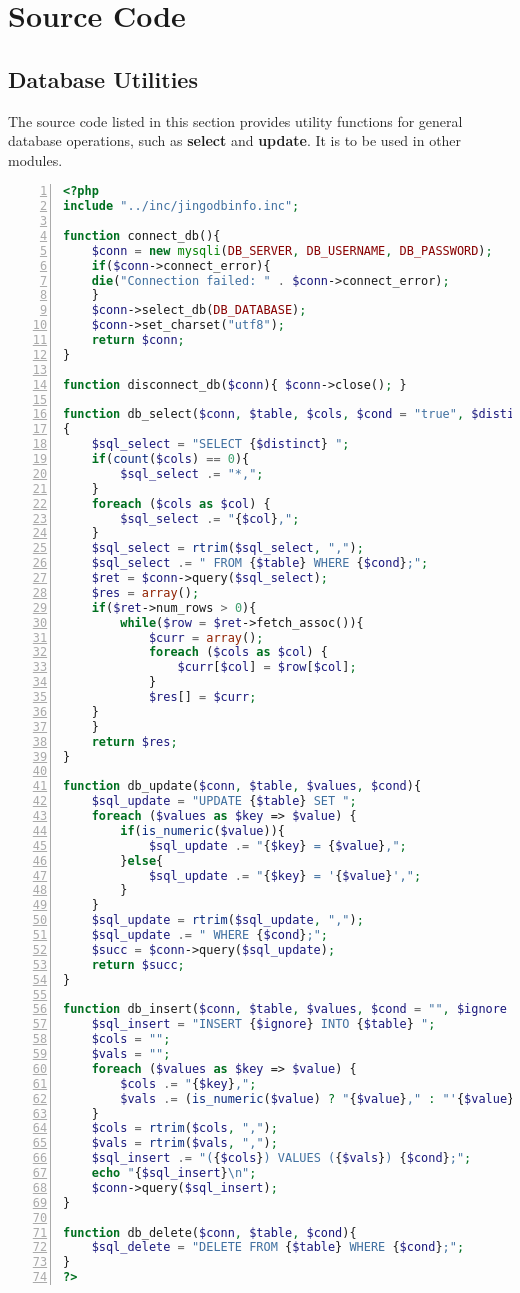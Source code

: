 \chapter{Source Code}
\section{Database Utilities}
The source code listed in this section provides utility functions for general database operations, such as \textbf{select} and \textbf{update}. It is to be used in other modules. 

\begin{lstlisting}[language = PHP, caption = {Database Utilities}, label = {AList:db_utilities}, frame=single, numbers=left, stepnumber=1]
<?php
include "../inc/jingodbinfo.inc";

function connect_db(){
    $conn = new mysqli(DB_SERVER, DB_USERNAME, DB_PASSWORD);
    if($conn->connect_error){
	die("Connection failed: " . $conn->connect_error);
    }
    $conn->select_db(DB_DATABASE);
    $conn->set_charset("utf8");
    return $conn;
}

function disconnect_db($conn){ $conn->close(); }

function db_select($conn, $table, $cols, $cond = "true", $distinct = "")
{
    $sql_select = "SELECT {$distinct} ";
    if(count($cols) == 0){
        $sql_select .= "*,";
    }
    foreach ($cols as $col) {
        $sql_select .= "{$col},";
    }
    $sql_select = rtrim($sql_select, ",");
    $sql_select .= " FROM {$table} WHERE {$cond};";
    $ret = $conn->query($sql_select);
    $res = array();
    if($ret->num_rows > 0){
        while($row = $ret->fetch_assoc()){
            $curr = array();
            foreach ($cols as $col) {
                $curr[$col] = $row[$col];
            }
            $res[] = $curr;
	}
    }
    return $res;
}

function db_update($conn, $table, $values, $cond){
    $sql_update = "UPDATE {$table} SET ";
    foreach ($values as $key => $value) {
        if(is_numeric($value)){
            $sql_update .= "{$key} = {$value},";
        }else{
            $sql_update .= "{$key} = '{$value}',";
        }
    }
    $sql_update = rtrim($sql_update, ",");
    $sql_update .= " WHERE {$cond};";
    $succ = $conn->query($sql_update);
    return $succ;
}

function db_insert($conn, $table, $values, $cond = "", $ignore = ""){
    $sql_insert = "INSERT {$ignore} INTO {$table} ";
    $cols = "";
    $vals = "";
    foreach ($values as $key => $value) {
        $cols .= "{$key},";
        $vals .= (is_numeric($value) ? "{$value}," : "'{$value}',");
    }
    $cols = rtrim($cols, ",");
    $vals = rtrim($vals, ",");
    $sql_insert .= "({$cols}) VALUES ({$vals}) {$cond};";
    echo "{$sql_insert}\n";
    $conn->query($sql_insert);
}

function db_delete($conn, $table, $cond){
    $sql_delete = "DELETE FROM {$table} WHERE {$cond};";
}
?>
\end{lstlisting}

